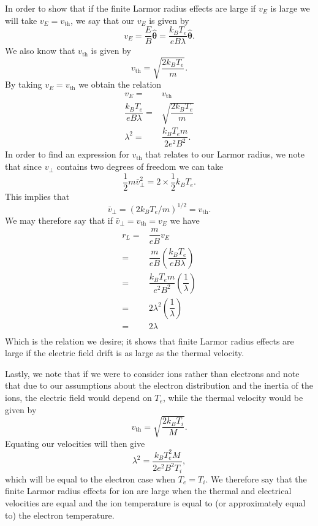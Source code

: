 In order to show that if the finite Larmor radius effects are large if \(v_E\) is large we will take \(v_E = v_\text{th} \), we say that our \(v_E\) is given by
\begin{equation*}
	v_E = \dfrac{E}{B}\hat{\bm{\theta}} = \dfrac{k_BT_e}{eB\lambda}\hat{\bm{\theta}}.
\end{equation*}
We also know that \(v_\text{th} \) is given by 
\begin{equation*}
	v_\text{th} = \sqrt{\dfrac{2k_BT_e}{m}}.
\end{equation*}
By taking \(v_E = v_\text{th} \) we obtain the relation
\begin{align*}
	v_E =& v_\text{th}\\
	\dfrac{k_BT_e}{eB\lambda} =& \sqrt{\dfrac{2k_BT_e}{m}}\\
	\lambda^2 =& \dfrac{k_BT_em}{2e^2B^2}.
\end{align*}
In order to find an expression for \(v_\text{th}\) that relates to our Larmor radius, we note that since \(v_\perp\) contains two degrees of freedom we can take
\begin{equation*}
	\dfrac{1}{2}m\bar{v}_\perp^2 = 2\times\dfrac{1}{2}k_BT_e.
\end{equation*}
This implies that 
\begin{equation*}
	\bar{v}_\perp = \left(2k_BT_e/m\right)^{1/2} = v_\text{th}.
\end{equation*}
We may therefore say that if \(\bar{v}_\perp = v_\text{th} = v_E \) we have
\begin{align*}
	r_L =& \dfrac{m}{eB} v_E \\
	=& \dfrac{m}{eB} \left(\dfrac{k_BT_e}{eB\lambda}\right) \\
	=& \dfrac{k_BT_em}{e^2B^2} \left(\dfrac{1}{\lambda}\right) \\
	=& 2\lambda^2 \left(\dfrac{1}{\lambda}\right) \\
	=& 2\lambda \\
\end{align*}
Which is the relation we desire; it shows that finite Larmor radius effects are large if the electric field drift is as large as the thermal velocity.

Lastly, we note that if we were to consider ions rather than electrons and note that due to our assumptions about the electron distribution and the inertia of the ions, the electric field would depend on \(T_e\), while the thermal velocity would be given by
\begin{equation*}
	v_\text{th} = \sqrt{\dfrac{2k_BT_i}{M}}.
\end{equation*}
Equating our velocities will then give
\begin{equation*}
	\lambda^2 = \dfrac{k_BT_e^2M}{2e^2B^2T_i},
\end{equation*}
which will be equal to the electron case when \(T_e = T_i\). We therefore say that the finite Larmor radius effects for ion are large when the thermal and electrical velocities are equal and the ion temperature is equal to (or approximately equal to) the electron temperature.

